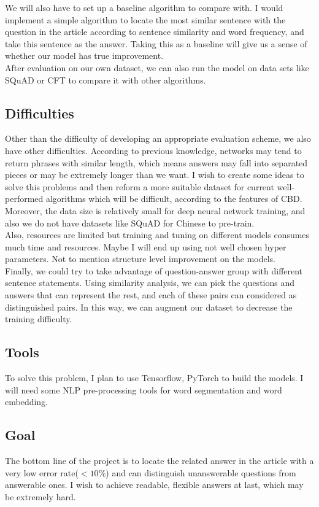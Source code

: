 \documentclass{article}
\begin{document}
We will also have to set up a baseline algorithm to compare with.
I would implement a simple algorithm to locate the most similar sentence with the question in the article according to sentence similarity and word frequency, and take this sentence as the answer. Taking this as a baseline will give us a sense of whether our model has true improvement.\\

After evaluation on our own dataset, we can also run the model on data sets like SQuAD or CFT to compare it with other algorithms.
\subsection{Difficulties}
Other than the difficulty of developing an appropriate evaluation scheme, we also have other difficulties. According to previous knowledge, networks may tend to return phrases with similar length, which means answers may fall into separated pieces or may be extremely longer than we want. I wish to create some ideas to solve this problems and then reform a more suitable dataset for current well-performed algorithms which will be difficult, according to the features of CBD. \\
Moreover, the data size is relatively small for deep neural network training, and also we do not have datasets like SQuAD for Chinese to pre-train. \\
Also, resources are limited but training and tuning on different models consumes much time and resources. Maybe I will end up using not well chosen hyper parameters. Not to mention structure level improvement on the models.\\
Finally, we could try to take advantage of question-answer group with different sentence statements. Using similarity analysis, we can pick the questions and answers that can represent the rest, and each of these pairs can considered as distinguished pairs. In this way, we can augment our dataset to decrease the training difficulty.
\subsection{Tools}
To solve this problem, I plan to use Tensorflow, PyTorch to build the models. I will need some NLP pre-processing tools for word segmentation and word embedding. 
\subsection{Goal}
The bottom line of the project is to locate the related answer in the article with a very low error rate($<10\%$) and can distinguish unanswerable questions from answerable ones. I wish to achieve readable, flexible answers at last, which may be extremely hard.
\end{document}
